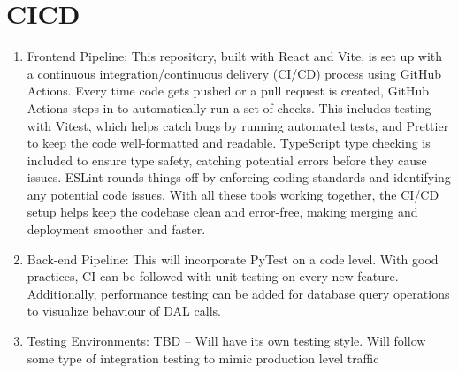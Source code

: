 \documentclass{article}
\begin{document}
\section{CICD}

\begin{enumerate}
    \item Frontend Pipeline: This repository, built with React and Vite, is set up with a continuous integration/continuous delivery (CI/CD) process using GitHub Actions. Every time code gets pushed or a pull request is created, GitHub Actions steps in to automatically run a set of checks. This includes testing with Vitest, which helps catch bugs by running automated tests, and Prettier to keep the code well-formatted and readable. TypeScript type checking is included to ensure type safety, catching potential errors before they cause issues. ESLint rounds things off by enforcing coding standards and identifying any potential code issues. With all these tools working together, the CI/CD setup helps keep the codebase clean and error-free, making merging and deployment smoother and faster.
    \item Back-end Pipeline: This will incorporate PyTest on a code level. With good practices, CI can be followed with unit testing on every new feature. Additionally, performance testing can be added for database query operations to visualize behaviour of DAL calls. 
    \item Testing Environments: TBD -- Will have its own testing style. Will follow some type of integration testing to mimic production level traffic
\end{enumerate}
\end{document}
